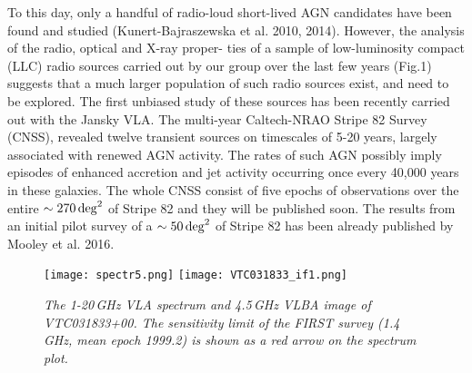 \documentclass[utf8]{frontiersSCNS} %
\begin{document}
To this day, only a handful of radio-loud short-lived AGN candidates have been found and studied (Kunert-Bajraszewska et al. 2010, 2014). However, the analysis of the radio, optical and X-ray proper-
ties of a sample of low-luminosity compact (LLC) radio sources carried out by our group over the last few years (Fig.1) suggests that a much larger population of such radio sources exist, and need to be explored.
The first unbiased study of these sources has been recently carried out with the Jansky VLA. The multi-year Caltech-NRAO Stripe 82 Survey (CNSS), revealed twelve transient sources on timescales of 5-20 years, largely associated with renewed AGN activity. The rates of such AGN possibly imply episodes of enhanced accretion and jet activity occurring once every 40,000 years in these galaxies. The whole CNSS consist of five epochs of observations over the entire $\sim 270\, \rm {deg}^{2}$ of Stripe 82 and they will be published soon.
The results from an initial pilot survey of a $\sim 50\, \rm {deg}^{2}$ of Stripe 82 has been already published by Mooley et al. 2016.







\begin{figure}[t]
\texttt{[image: spectr5.png]}
\texttt{[image: VTC031833\_if1.png]}
\caption{\small \it The 1-20\,GHz VLA spectrum and 4.5\,GHz VLBA image of VTC031833+00. The sensitivity limit of the FIRST survey (1.4\,GHz, mean epoch 1999.2) is shown as a red arrow on the spectrum plot.}
\label{}
\end{figure}
\end{document}
